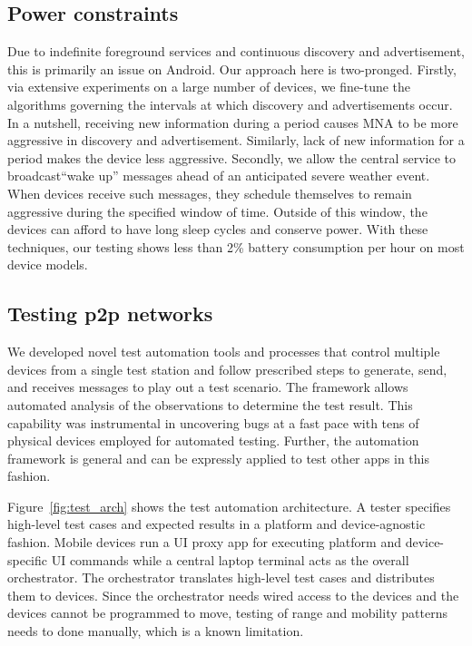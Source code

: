 \documentclass[conference]{IEEEtran}
\begin{document}
%
\subsection{Power constraints}
\label{sec:power}
%
Due to indefinite foreground services and continuous discovery and
advertisement, this is primarily an issue on Android. Our approach
here is two-pronged. Firstly, via extensive experiments on a large
number of devices, we fine-tune the algorithms governing the intervals
at which discovery and advertisements occur. In a nutshell, receiving
new information during a period causes MNA to be more aggressive in
discovery and advertisement. Similarly, lack of new information for a
period makes the device less aggressive. Secondly, we allow the
central service to broadcast``wake up'' messages ahead of an
anticipated severe weather event.  When devices receive such messages,
they schedule themselves to remain aggressive during the specified
window of time.  Outside of this window, the devices can afford to have
long sleep cycles and conserve power. With these techniques, our
testing shows less than 2\% battery consumption per hour on most
device models.
%
\subsection{Testing p2p networks}
\label{sec:texting}
%
We developed novel test automation tools and processes that control
multiple devices from a single test station and follow prescribed
steps to generate, send, and receives messages to play out a test
scenario.  The framework allows automated analysis of the observations
to determine the test result. This capability was instrumental in
uncovering bugs at a fast pace with tens of physical devices employed
for automated testing.  Further, the automation framework is general
and can be expressly applied to test other apps in this fashion.

Figure~\ref{fig:test_arch} shows the test automation architecture. A
tester specifies high-level test cases and expected results in a
platform and device-agnostic fashion. Mobile devices run a UI proxy
app for executing platform and device-specific UI commands while a
central laptop terminal acts as the overall orchestrator. The
orchestrator translates high-level test cases and distributes them to
devices. Since the orchestrator needs wired access to the devices and
the devices cannot be programmed to move, testing of range and
mobility patterns needs to done manually, which is a known limitation.
\end{document}
